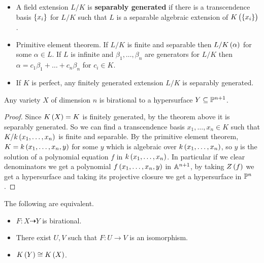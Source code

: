 \begin{definition}
\hfill
\begin{itemize}
\item A field extension $ L / K $ is \textbf{separably generated} if there is a transcendence basis $ \cbr{x_i} $ for $ L / K $ such that $ L $ is a separable algebraic extension of $ K\br{\cbr{x_i}} $.
\item Primitive element theorem. If $ L / K $ is finite and separable then $ L / K\br{\alpha} $ for some $ \alpha \in L $. If $ L $ is infinite and $ \beta_1, \dots, \beta_n $ are generators for $ L / K $ then $ \alpha = c_1\beta_1 + \dots + c_n\beta_n $ for $ c_i \in K $.
\item If $ K $ is perfect, any finitely generated extension $ L / K $ is separably generated.
\end{itemize}
\end{definition}

\begin{theorem}
Any variety $ X $ of dimension $ n $ is birational to a hypersurface $ Y \subseteq \P^{n + 1} $.
\end{theorem}

\begin{proof}
Since $ K\br{X} = K $ is finitely generated, by the theorem above it is separably generated. So we can find a transcendence basis $ x_1, \dots, x_n \in K $ such that $ K / k\br{x_1, \dots, x_n} $ is finite and separable. By the primitive element theorem, $ K = k\br{x_1, \dots, x_n, y} $ for some $ y $ which is algebraic over $ k\br{x_1, \dots, x_n} $, so $ y $ is the solution of a polynomial equation $ f $ in $ k\br{x_1, \dots, x_n} $. In particular if we clear denominators we get a polynomial $ f\br{x_1, \dots, x_n, y} $ in $ \A^{n + 1} $, by taking $ Z\br{f} $ we get a hypersurface and taking its projective closure we get a hypersurface in $ \P^n $.
\end{proof}


\begin{corollary}
The following are equivalent.
\begin{itemize}
\item $ F : X \dashrightarrow Y $ is birational.
\item There exist $ U, V $ such that $ F : U \to V $ is an isomorphism.
\item $ K\br{Y} \cong K\br{X} $.
\end{itemize}
\end{corollary}

